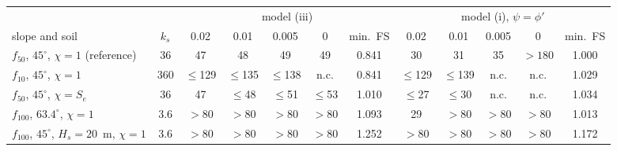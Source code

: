 \begin{tabular}{lc ccccc ccccc}
\toprule
 & & \multicolumn{5}{c}{model (iii)} & \multicolumn{5}{c}{model (i), $\psi=\phi'$}\\
\cmidrule(lr){3-7}\cmidrule(lr){8-12}
slope and soil & $k_s$ & 0.02 & 0.01 & 0.005 & 0 & min.\ FS & 0.02 & 0.01 & 0.005 & 0 & min.\ FS\\
\midrule
$f_{50}$, $45^\circ$, $\chi=1$ (reference) & 36 & 47 & 48 & 49 & 49 & 0.841 & 30 & 31 & 35 & $>180$ & 1.000\\
$f_{10}$, $45^\circ$, $\chi=1$ & 360 & $\le$129 & $\le$135 & $\le$138 & n.c. & 0.841 & $\le$129 & $\le$139 & n.c. & n.c. & 1.029\\
$f_{50}$, $45^\circ$, $\chi=S_e$ & 36 & 47 & $\le$48 & $\le$51 & $\le$53 & 1.010 & $\le$27 & $\le$30 & n.c. & n.c. & 1.034\\
$f_{100}$, $63.4^\circ$, $\chi=1$ & 3.6 & $>80$ & $>80$ & $>80$ & $>80$ & 1.093 & 29 & $>80$ & $>80$ & $>80$ & 1.013\\
$f_{100}$, $45^\circ$, $H_s=20$~m, $\chi=1$ & 3.6 & $>80$ & $>80$ & $>80$ & $>80$ & 1.252 & $>80$ & $>80$ & $>80$ & $>80$ & 1.172\\
\bottomrule
\end{tabular}
